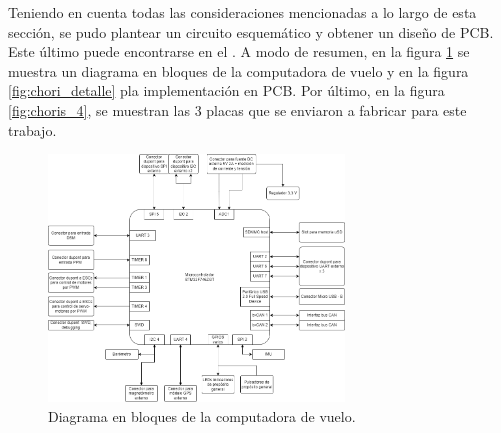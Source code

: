 Teniendo en cuenta todas las consideraciones mencionadas a lo largo de esta sección, se pudo plantear un circuito esquemático y obtener un diseño de PCB. Este último puede encontrarse en el . A modo de resumen, en la figura \ref{fig:diagrama_en_bloques_computadora_de_vuelo} se muestra un diagrama en bloques de la computadora de vuelo y en la figura \ref{fig:chori_detalle} pla implementación en PCB. Por último, en la figura \ref{fig:choris_4}, se muestran las 3 placas que se enviaron a fabricar para este trabajo.



\begin{figure}[H]
    \centering
    \includegraphics[width=0.7\textwidth]{img/diagrama_en_bloques_computadora_de_vuelo.png}
    \caption{Diagrama en bloques de la computadora de vuelo.}
    \label{fig:diagrama_en_bloques_computadora_de_vuelo}
\end{figure}

